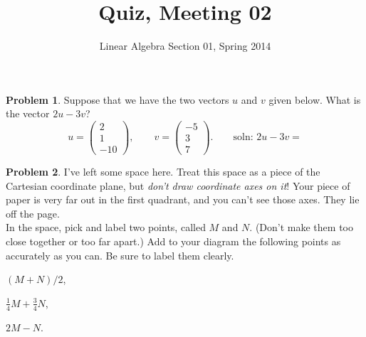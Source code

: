 \documentclass[11pt]{amsart}
\theoremstyle{definition}
\newtheorem{problem}{Problem}
\begin{document}
\title{Quiz, Meeting 02}
\author{Linear Algebra Section 01, Spring 2014}

\maketitle

\begin{problem}
Suppose that we have the two vectors $u$ and $v$ given below. What is the vector $2u - 3v$?
\[
u = \begin{pmatrix} 2 \\ 1 \\ -10 \end{pmatrix}, \qquad 
v = \begin{pmatrix} -5 \\ 3 \\ 7\end{pmatrix}. \qquad \text{soln: } 2 u-3v = 
\]

\end{problem}

\vspace{.25in}

\begin{problem}
I've left some space here. Treat this space as a piece of the Cartesian coordinate plane, but \emph{don't draw coordinate axes on it}! Your piece of paper is very far out in the first quadrant, and you can't see those axes. They lie off the page.\\

In the space, pick and label two points, called $M$ and $N$. (Don't make them too close together or too far apart.) Add to your diagram the following points as accurately as you can. Be sure to label them clearly.
\begin{compactitem}
\begin{multicols}{3}
\item $(M+N)/2$,
\item $\frac{1}{4}M + \frac{3}{4}N$,
\item $2 M - N$.
\end{multicols}
\end{compactitem}

\end{problem}

\vfill
\end{document}
